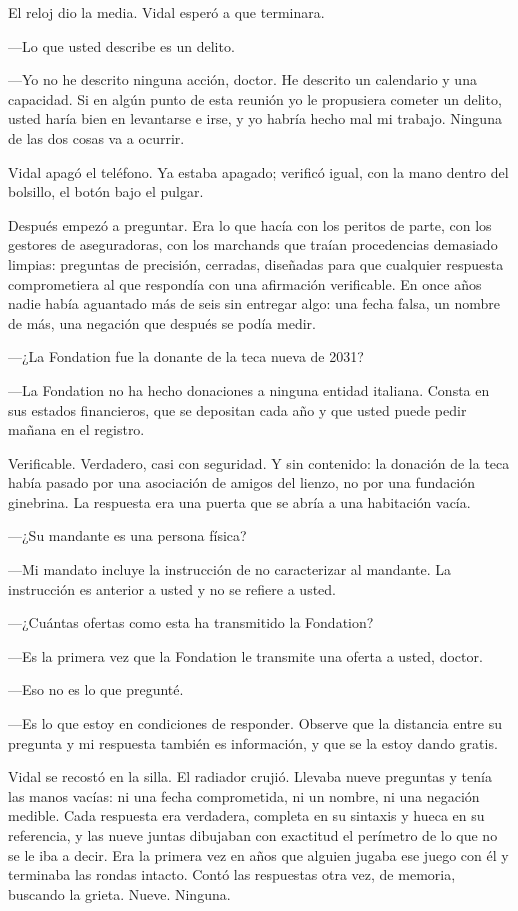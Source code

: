 El reloj dio la media. Vidal esperó a que terminara.

---Lo que usted describe es un delito.

---Yo no he descrito ninguna acción, doctor. He descrito un calendario y una capacidad. Si en algún punto de esta reunión yo le propusiera cometer un delito, usted haría bien en levantarse e irse, y yo habría hecho mal mi trabajo. Ninguna de las dos cosas va a ocurrir.

Vidal apagó el teléfono. Ya estaba apagado; verificó igual, con la mano dentro del bolsillo, el botón bajo el pulgar.

Después empezó a preguntar. Era lo que hacía con los peritos de parte, con los gestores de aseguradoras, con los marchands que traían procedencias demasiado limpias: preguntas de precisión, cerradas, diseñadas para que cualquier respuesta comprometiera al que respondía con una afirmación verificable. En once años nadie había aguantado más de seis sin entregar algo: una fecha falsa, un nombre de más, una negación que después se podía medir.

---¿La Fondation fue la donante de la teca nueva de 2031?

---La Fondation no ha hecho donaciones a ninguna entidad italiana. Consta en sus estados financieros, que se depositan cada año y que usted puede pedir mañana en el registro.

Verificable. Verdadero, casi con seguridad. Y sin contenido: la donación de la teca había pasado por una asociación de amigos del lienzo, no por una fundación ginebrina. La respuesta era una puerta que se abría a una habitación vacía.

---¿Su mandante es una persona física?

---Mi mandato incluye la instrucción de no caracterizar al mandante. La instrucción es anterior a usted y no se refiere a usted.

---¿Cuántas ofertas como esta ha transmitido la Fondation?

---Es la primera vez que la Fondation le transmite una oferta a usted, doctor.

---Eso no es lo que pregunté.

---Es lo que estoy en condiciones de responder. Observe que la distancia entre su pregunta y mi respuesta también es información, y que se la estoy dando gratis.

Vidal se recostó en la silla. El radiador crujió. Llevaba nueve preguntas y tenía las manos vacías: ni una fecha comprometida, ni un nombre, ni una negación medible. Cada respuesta era verdadera, completa en su sintaxis y hueca en su referencia, y las nueve juntas dibujaban con exactitud el perímetro de lo que no se le iba a decir. Era la primera vez en años que alguien jugaba ese juego con él y terminaba las rondas intacto. Contó las respuestas otra vez, de memoria, buscando la grieta. Nueve. Ninguna.

